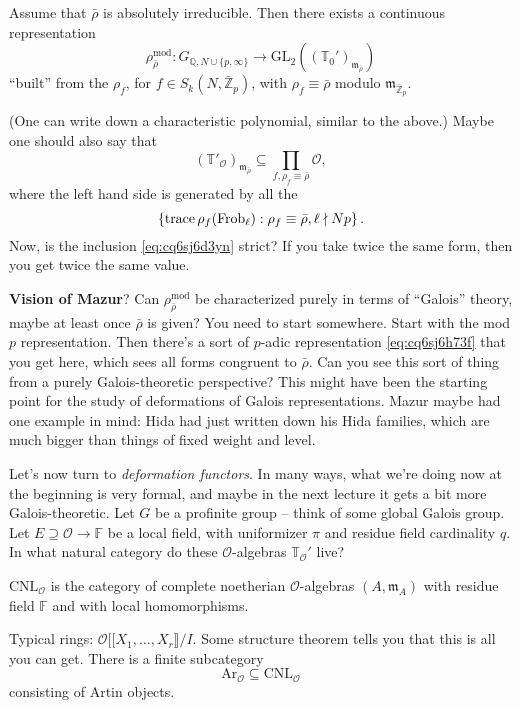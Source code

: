 \documentclass[reqno]{amsart} 
\begin{document}
\begin{theorem}
  Assume that $\bar{\rho}$ is absolutely irreducible.  Then there exists a continuous representation
  \begin{equation}\label{eq:cq6sj6h73f}
    \rho_{\bar{\rho}}^{\mathrm{mod}} : G_{\mathbb{Q}, N \cup \{p, \infty\}} \rightarrow \mathrm{GL}_2 \left((\mathbb{T}_0 ')_{\mathfrak{m}_{\bar{\rho}}} \right)
  \end{equation}
  ``built'' from the $\rho_f$, for $f \in S_k(N, \bar{\mathbb{Z}}_p)$, with $\rho_f \equiv \bar{\rho}$ modulo $\mathfrak{m}_{\bar{\mathbb{Z}}_p}$.
\end{theorem}
(One can write down a characteristic polynomial, similar to the above.)  Maybe one should also say that
\begin{equation}\label{eq:cq6sj6d3yn}
  \left( \mathbb{T} '_{\mathcal{O}} \right)_{\mathfrak{m}_{\bar{\rho}}} \subseteq \prod_{f, \rho_f \equiv \bar{\rho}} \mathcal{O},
\end{equation}
where the left hand side is generated by all the
\begin{equation*}
  \left\{ \operatorname{trace} \rho_f(\operatorname{Frob}_{\ell}) : \rho_f \equiv \bar{\rho}, \ell \nmid N p \right\}.
\end{equation*}
Now, is the inclusion \eqref{eq:cq6sj6d3yn} strict?  If you take twice the same form, then you get twice the same value.

\textbf{Vision of Mazur}?  Can $\rho_{\bar{\rho}}^{\mathrm{mod}}$ be characterized purely in terms of ``Galois'' theory, maybe at least once $\bar{\rho}$ is given?  You need to start somewhere.  Start with the mod $p$ representation.  Then there's a sort of $p$-adic representation \eqref{eq:cq6sj6h73f} that you get here, which sees all forms congruent to $\bar{\rho}$.  Can you see this sort of thing from a purely Galois-theoretic perspective?  This might have been the starting point for the study of deformations of Galois representations.  Mazur maybe had one example in mind: Hida had just written down his Hida families, which are much bigger than things of fixed weight and level.

Let's now turn to \emph{deformation functors}.  In many ways, what we're doing now at the beginning is very formal, and maybe in the next lecture it gets a bit more Galois-theoretic.  Let $G$ be a profinite group -- think of some global Galois group.  Let $E \supseteq \mathcal{O} \rightarrow \mathbb{F}$ be a local field, with uniformizer $\pi$ and residue field cardinality $q$.  In what natural category do these $\mathcal{O}$-algebras $\mathbb{T}_{\mathcal{O}}'$ live?
\begin{definition}
  $\mathrm{C N L }_{\mathcal{O}}$ is the category of complete noetherian $\mathcal{O}$-algebras $(A, \mathfrak{m}_{A})$ with residue field $\mathbb{F}$ and with local homomorphisms.
\end{definition}
Typical rings: $\mathcal{O} [[ X_1, \dotsc, X_r\rrbracket / I$.  Some structure theorem tells you that this is all you can get.  There is a finite subcategory
\begin{equation*}
  \mathrm{Ar}_{\mathcal{O}} \subseteq \mathrm{C N L}_{\mathcal{O}}
\end{equation*}
consisting of Artin objects.
\end{document}
